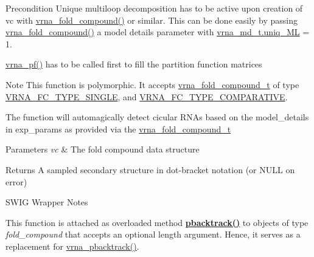 \begin{DoxyPrecond}{Precondition}
Unique multiloop decomposition has to be active upon creation of {\ttfamily vc} with \mbox{\hyperlink{group__fold__compound_ga6601d994ba32b11511b36f68b08403be}{vrna\+\_\+fold\+\_\+compound()}} or similar. This can be done easily by passing \mbox{\hyperlink{group__fold__compound_ga6601d994ba32b11511b36f68b08403be}{vrna\+\_\+fold\+\_\+compound()}} a model details parameter with \mbox{\hyperlink{group__model__details_ade065b814a4e2e72ead93ab502613ed2}{vrna\+\_\+md\+\_\+t.\+uniq\+\_\+\+ML}} = 1. 

\mbox{\hyperlink{group__pf__fold_ga29e256d688ad221b78d37f427e0e99bc}{vrna\+\_\+pf()}} has to be called first to fill the partition function matrices
\end{DoxyPrecond}
\begin{DoxyNote}{Note}
This function is polymorphic. It accepts \mbox{\hyperlink{group__fold__compound_ga1b0cef17fd40466cef5968eaeeff6166}{vrna\+\_\+fold\+\_\+compound\+\_\+t}} of type \mbox{\hyperlink{group__fold__compound_gga01a4ff86fa71deaaa5d1abbd95a1447da7e264dd3cf2dc9b6448caabcb7763cd6}{V\+R\+N\+A\+\_\+\+F\+C\+\_\+\+T\+Y\+P\+E\+\_\+\+S\+I\+N\+G\+LE}}, and \mbox{\hyperlink{group__fold__compound_gga01a4ff86fa71deaaa5d1abbd95a1447dab821ce46ea3cf665be97df22a76f5023}{V\+R\+N\+A\+\_\+\+F\+C\+\_\+\+T\+Y\+P\+E\+\_\+\+C\+O\+M\+P\+A\+R\+A\+T\+I\+VE}}.

The function will automagically detect cicular R\+N\+As based on the model\+\_\+details in exp\+\_\+params as provided via the \mbox{\hyperlink{group__fold__compound_ga1b0cef17fd40466cef5968eaeeff6166}{vrna\+\_\+fold\+\_\+compound\+\_\+t}}
\end{DoxyNote}

\begin{DoxyParams}{Parameters}
{\em vc} & The fold compound data structure \\
\hline
\end{DoxyParams}
\begin{DoxyReturn}{Returns}
A sampled secondary structure in dot-\/bracket notation (or N\+U\+LL on error)
\end{DoxyReturn}
\begin{DoxyRefDesc}{S\+W\+I\+G Wrapper Notes}
\item[\mbox{\hyperlink{wrappers__wrappers000087}{S\+W\+I\+G Wrapper Notes}}]This function is attached as overloaded method {\bfseries \mbox{\hyperlink{group__subopt__stochbt_gac03ca6db186bb3bf0a2a326d7fb3ba03}{pbacktrack()}}} to objects of type {\itshape fold\+\_\+compound} that accepts an optional {\ttfamily length} argument. Hence, it serves as a replacement for \mbox{\hyperlink{group__subopt__stochbt_ga901fe42a33b07be083421741bf7dc610}{vrna\+\_\+pbacktrack()}}. \end{DoxyRefDesc}
\mbox{\label{group__subopt__stochbt_gac03ca6db186bb3bf0a2a326d7fb3ba03}} 
